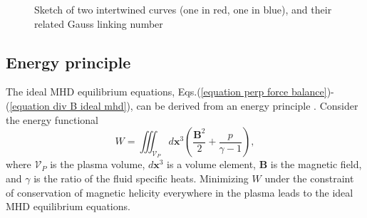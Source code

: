 \documentclass[my_thesis.tex]{subfiles}
\begin{document}
\begin{figure}
	\hspace{.125\linewidth}
	\hfill
	\hspace{.125\linewidth}
	\caption{Sketch of two intertwined curves (one in red, one in blue), and their related Gauss linking number}
	\label{fig gauss linking number}
\end{figure}



\subsection{Energy principle}
The ideal MHD equilibrium equations, Eqs.(\ref{equation perp force balance})-(\ref{equation div B ideal mhd}), can be derived from an energy principle \citep{kruskalEquilibriumMagneticallyConfined1958}. Consider the energy functional 
\begin{equation}
	W = \iiint_{\mathcal{V}_P} d\mathbf{x}^3 \left(\frac{\mathbf{B}^2}{2} + \frac{p}{\gamma-1}\right), \label{eq. energy functional}
\end{equation}
where $\mathcal{V}_P$ is the plasma volume, $d\mathbf{x}^3$ is a volume element, $\mathbf{B}$ is the magnetic field, and $\gamma$ is the ratio of the fluid specific heats. Minimizing $W$ under the constraint of conservation of magnetic helicity everywhere in the plasma leads to the ideal MHD equilibrium equations. 
\end{document}
